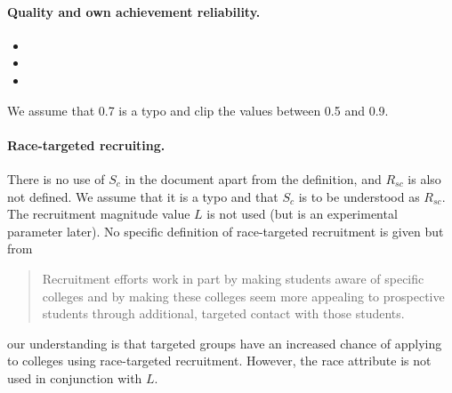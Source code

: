 \paragraph{Quality and own achievement reliability.}

\begin{itemize}

\item{}

\item{}

\item{}

\end{itemize}

We assume that 0.7 is a typo and clip the values between 0.5 and 0.9.

\paragraph{Race-targeted recruiting.}


There is no use of $S_c$ in the document apart from the definition, and $R_{sc}$ is also not defined. 
We assume that it is a typo and that $S_c$ is to be understood as $R_{sc}$. 
The recruitment magnitude value $L$ is not used (but is an experimental parameter later). 
No specific definition of race-targeted recruitment is given but from \blockquote[{\cite[Section~3]{reardon2018levels}}]{Recruitment efforts work in part by making students aware of specific colleges and by making these colleges seem more appealing to prospective students through additional, targeted contact with those students.} our understanding is that targeted groups have an increased chance of applying to colleges using race-targeted recruitment. 
However, the race attribute is not used in conjunction with $L$.

